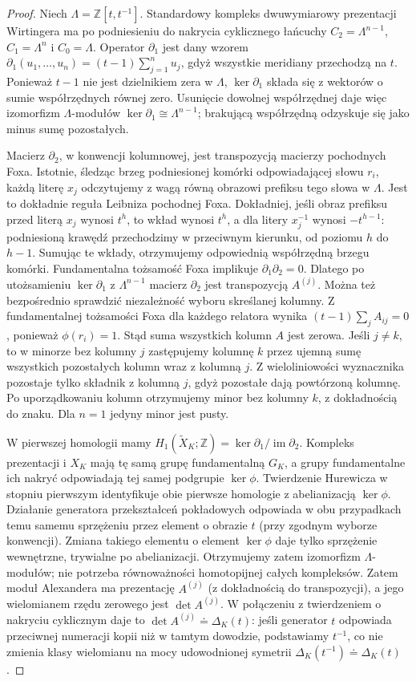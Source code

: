 \begin{proof}
Niech $\Lambda=\mathbb Z[t,t^{-1}]$.
Standardowy kompleks dwuwymiarowy prezentacji Wirtingera
ma po podniesieniu do nakrycia cyklicznego łańcuchy
$C_2=\Lambda^{n-1}$, $C_1=\Lambda^n$ i $C_0=\Lambda$.
Operator $\partial_1$ jest dany wzorem
$\partial_1(u_1,\dots,u_n)=(t-1)\sum_{j=1}^n u_j$,
gdyż wszystkie meridiany przechodzą na $t$.
Ponieważ $t-1$ nie jest dzielnikiem zera w $\Lambda$,
$\ker\partial_1$ składa się z wektorów o sumie współrzędnych
równej zero. Usunięcie dowolnej współrzędnej daje więc
izomorfizm $\Lambda$-modułów
$\ker\partial_1\cong\Lambda^{n-1}$; brakującą współrzędną
odzyskuje się jako minus sumę pozostałych.

Macierz $\partial_2$, w konwencji kolumnowej, jest
transpozycją macierzy pochodnych Foxa. Istotnie, śledząc
brzeg podniesionej komórki odpowiadającej słowu
$r_i$, każdą literę $x_j$ odczytujemy z wagą równą obrazowi
prefiksu tego słowa w $\Lambda$. Jest to dokładnie reguła
Leibniza pochodnej Foxa. Dokładniej, jeśli obraz
prefiksu przed literą $x_j$ wynosi $t^h$, to wkład
wynosi $t^h$, a dla litery $x_j^{-1}$ wynosi
$-t^{h-1}$: podniesioną krawędź przechodzimy
w przeciwnym kierunku, od poziomu $h$ do $h-1$.
Sumując te wkłady, otrzymujemy odpowiednią współrzędną
brzegu komórki.
Fundamentalna tożsamość Foxa implikuje
$\partial_1\partial_2=0$. Dlatego po utożsamieniu
$\ker\partial_1$ z $\Lambda^{n-1}$ macierz
$\partial_2$ jest transpozycją $A^{(j)}$.
Można też bezpośrednio sprawdzić niezależność
wyboru skreślanej kolumny. Z fundamentalnej
tożsamości Foxa dla każdego relatora wynika
$(t-1)\sum_j A_{ij}=0$, ponieważ $\phi(r_i)=1$.
Stąd suma wszystkich kolumn $A$ jest zerowa.
Jeśli $j\ne k$, to w minorze bez kolumny $j$
zastępujemy kolumnę $k$ przez ujemną sumę
wszystkich pozostałych kolumn wraz z kolumną $j$.
Z wieloliniowości wyznacznika pozostaje tylko
składnik z kolumną $j$, gdyż pozostałe dają
powtórzoną kolumnę. Po uporządkowaniu kolumn
otrzymujemy minor bez kolumny $k$, z dokładnością
do znaku. Dla $n=1$ jedyny minor jest pusty.

W pierwszej homologii mamy
$H_1(\widetilde X_K;\mathbb Z)=\ker\partial_1/
\operatorname{im}\partial_2$. Kompleks prezentacji i $X_K$ mają tę samą grupę
fundamentalną $G_K$, a grupy fundamentalne ich nakryć
odpowiadają tej samej podgrupie $\ker\phi$.
Twierdzenie Hurewicza w stopniu pierwszym identyfikuje
obie pierwsze homologie z abelianizacją $\ker\phi$.
Działanie generatora przekształceń pokładowych
odpowiada w obu przypadkach temu samemu sprzężeniu
przez element o obrazie $t$ (przy zgodnym wyborze konwencji).
Zmiana takiego elementu o element $\ker\phi$ daje tylko
sprzężenie wewnętrzne, trywialne po abelianizacji.
Otrzymujemy zatem izomorfizm $\Lambda$-modułów;
nie potrzeba równoważności homotopijnej całych kompleksów.
Zatem moduł Alexandera ma prezentację $A^{(j)}$
(z dokładnością do transpozycji), a jego wielomianem
rzędu zerowego jest $\det A^{(j)}$. W połączeniu z twierdzeniem o nakryciu cyklicznym
daje to $\det A^{(j)}\doteq\Delta_K(t)$:
jeśli generator $t$ odpowiada przeciwnej numeracji kopii
niż w tamtym dowodzie, podstawiamy $t^{-1}$, co nie zmienia
klasy wielomianu na mocy udowodnionej symetrii
$\Delta_K(t^{-1})\doteq\Delta_K(t)$.
\end{proof}


